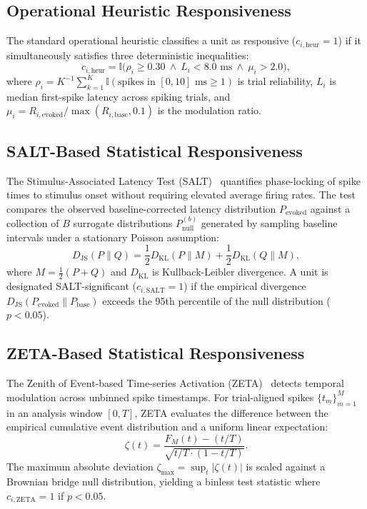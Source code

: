 \documentclass[10pt,journal,compsoc]{IEEEtran}
\begin{document}
\subsection{Operational Heuristic Responsiveness}
The standard operational heuristic classifies a unit as responsive ($c_{i,\text{heur}} = 1$) if it simultaneously satisfies three deterministic inequalities:
\begin{equation}
    c_{i,\text{heur}} = \mathbb{I}\Big( \rho_i \ge 0.30 \ \land \ L_i < 8.0\text{ ms} \ \land \ \mu_i > 2.0 \Big),
\end{equation}
where $\rho_i = K^{-1} \sum_{k=1}^K \mathbb{I}(\text{spikes in }[0, 10]\text{ ms} \ge 1)$ is trial reliability, $L_i$ is median first-spike latency across spiking trials, and $\mu_i = R_{i,\text{evoked}} / \max(R_{i,\text{base}}, 0.1)$ is the modulation ratio.

\subsection{SALT-Based Statistical Responsiveness}
The Stimulus-Associated Latency Test (SALT)~\cite{kvitsiani2013distinct} quantifies phase-locking of spike times to stimulus onset without requiring elevated average firing rates. The test compares the observed baseline-corrected latency distribution $P_{\text{evoked}}$ against a collection of $B$ surrogate distributions $P_{\text{null}}^{(b)}$ generated by sampling baseline intervals under a stationary Poisson assumption:
\begin{equation}
    D_{\text{JS}}(P \parallel Q) = \frac{1}{2} D_{\text{KL}}(P \parallel M) + \frac{1}{2} D_{\text{KL}}(Q \parallel M),
\end{equation}
where $M = \frac{1}{2}(P + Q)$ and $D_{\text{KL}}$ is Kullback-Leibler divergence. A unit is designated SALT-significant ($c_{i,\text{SALT}} = 1$) if the empirical divergence $D_{\text{JS}}(P_{\text{evoked}} \parallel P_{\text{base}})$ exceeds the 95th percentile of the null distribution ($p < 0.05$).

\subsection{ZETA-Based Statistical Responsiveness}
The Zenith of Event-based Time-series Activation (ZETA)~\cite{montijn2021zeta} detects temporal modulation across unbinned spike timestamps. For trial-aligned spikes $\{t_m\}_{m=1}^M$ in an analysis window $[0, T]$, ZETA evaluates the difference between the empirical cumulative event distribution and a uniform linear expectation:
\begin{equation}
    \zeta(t) = \frac{F_M(t) - (t/T)}{\sqrt{t/T \cdot (1 - t/T)}}.
\end{equation}
The maximum absolute deviation $\zeta_{\max} = \sup_{t} |\zeta(t)|$ is scaled against a Brownian bridge null distribution, yielding a binless test statistic where $c_{i,\text{ZETA}} = 1$ if $p < 0.05$.
\end{document}
